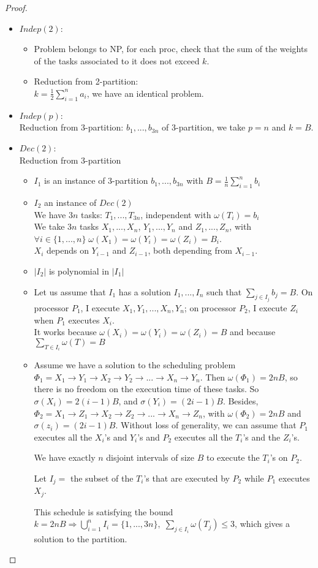 \begin{proof}
\begin{itemize}
\item $Indep(2)$:
\begin{itemize}
\item Problem belongs to NP, for each proc, check that the sum of the weights of the tasks associated to it does not exceed $k$.
\item Reduction from 2-partition:\\
$k=\frac{1}{2} \sum_{i=1}^{n}a_i$, we have an identical problem.
\end{itemize}
\item $Indep(p)$:\\
Reduction from 3-partition: $b_1,...,b_{3n}$ of 3-partition, we take $p=n$ and $k=B$.

\item $Dec(2)$:\\
Reduction from 3-partition
\begin{itemize}
\item $I_1$ is an instance of 3-partition $b_1,...,b_{3n}$ with $B=\frac{1}{n}\sum_{i=1}^n b_i$
\item $I_2$ an instance of $Dec(2)$\\
We have $3n$ tasks: $T_1,...,T_{3n}$, independent with $\omega (T_i)=b_i$\\
We take $3n$ tasks $X_1,...,X_n$, $Y_1,...,Y_n$ and $Z_1,...,Z_n$, with $\forall i \in \{1,...,n\} \; \omega (X_1) = \omega (Y_i) = \omega (Z_i) = B_i$.\\
$X_i$ depends on $Y_{i-1}$ and $Z_{i-1}$, both depending from $X_{i-1}$.
\item $|I_2|$ is polynomial in $|I_1|$
\item Let us assume that $I_1$ has a solution $I_1,...,I_n$ such that $\sum_{j\in I_j} b_j=B$. On processor $P_1$, I execute $X_1,Y_1,...,X_n,Y_n$; on processor $P_2$, I execute $Z_i$ when $P_1$ executes $X_i$.\\
It works because $\omega (X_i)=\omega (Y_i) =\omega (Z_i) = B$ and because $\sum_{T\in I_i} \omega(T) = B$
\item Assume we have a solution to the scheduling problem $\Phi_1=X_1 \to Y_1 \to X_2 \to Y_2 \to ... \to X_n \to Y_n$. Then $\omega(\Phi_1)=2nB$, so there is no freedom on the execution time of these tasks. So $\sigma (X_i)=2(i-1)B$, and $\sigma (Y_i)=(2i-1)B$.
Besides, $\Phi_2=X_1 \to Z_1 \to X_2 \to Z_2 \to ... \to X_n \to Z_n$, with $\omega(\Phi_2)=2nB$ and $\sigma(z_i)=(2i-1)B$. Without loss of generality, we can assume that $P_1$ executes all the $X_i$'s and $Y_i$'s and $P_2$ executes all the $T_i$'s and the $Z_i$'s.

We have exactly $n$ disjoint intervals of size $B$ to execute the $T_i$'s on $P_2$.

Let $I_j=$ the subset of the $T_i$'s that are executed by $P_2$ while $P_1$ executes $X_j$.

This schedule is satisfying the bound $k=2nB \Rightarrow \bigcup_{i=1}^n I_i = \{ 1,...,3n\}, \; \sum_{j\in I_i} \omega(T_j)\leq 3$, which gives a solution to the partition.
\end{itemize}
\end{itemize}
\end{proof}

